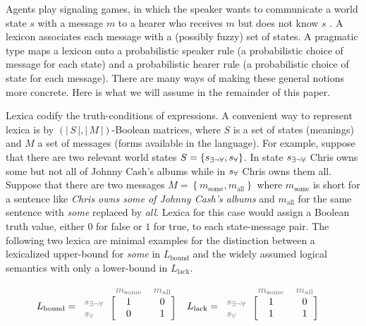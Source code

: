 \documentclass[a4paper, 11pt]{article}
\theoremstyle{Satz}
\newcommand{\set}[1]{\left\{#1\right\}}
\newcommand{\card}[1]{\left \lvert \, #1 \, \right\rvert}
\newcommand{\States}{\ensuremath{S}\xspace}		%
\newcommand{\state}{\ensuremath{s}\xspace}		%
\newcommand{\mystate}[1]{\ensuremath{\state_{\text{#1}}}\xspace} %
\newcommand{\mylang}[1]{\ensuremath{L_{\text{#1}}}\xspace} %
\newcommand{\Messgs}{\ensuremath{M}\xspace}		%
\newcommand{\messg}{\ensuremath{m}\xspace}		%
\newcommand{\mymessg}[1]{\ensuremath{\messg_{\text{#1}}}\xspace} %
\newcommand{\ssome}{\mystate{\ensuremath{\exists\neg\forall}}}
\newcommand{\sall}{\mystate{\ensuremath{\forall}}}
\newcommand{\msome}{\mymessg{some}}
\newcommand{\mall}{\mymessg{all}}
\newcommand{\Lbound}{\mylang{bound}}
\newcommand{\Llack}{\mylang{lack}}
\newcommand{\mygray}[1]{{\textcolor{mygray}{#1}}}
\begin{document}
Agents play signaling games, in which the speaker wants to communicate a world state $s$ with a
message $m$ to a hearer who receives $m$ but does not know $s$
\citep[e.g.][]{lewis:1969,Skyrms2010:Signals}. A lexicon associates each message with a
(possibly fuzzy) set of states. A pragmatic type maps a lexicon onto a probabilistic speaker
rule (a probabilistic choice of message for each state) and a probabilistic hearer rule (a
probabilistic choice of state for each message). There are many ways of making these general
notions more concrete. Here is what we will assume in the remainder of this paper.

Lexica codify the truth-conditions of expressions. A convenient way to represent lexica is by
$(\card{\States}, \card{\Messgs})$-Boolean matrices, where $\States$ is a set of states
(meanings) and $M$ a set of messages (forms available in the language). For example, suppose
that there are two relevant world states $\States = \set{\ssome, \sall}$. In state $\ssome$
Chris owns some but not all of Johnny Cash's albums while in $\sall$ Chris owns them
all. Suppose that there are two messages $\Messgs = \set{\msome, \mall}$ where $\msome$ is
short for a sentence like \emph{Chris owns some of Johnny Cash's albums} and $\mall$ for the
same sentence with \emph{some} replaced by \emph{all}.  Lexica for this case would assign a
Boolean truth value, either $0$ for false or $1$ for true, to each state-message pair. The
following two lexica are minimal examples for the distinction between a lexicalized upper-bound
for \emph{some} in $\Lbound$ and the widely assumed logical semantics with only a lower-bound
in $\Llack$.

\begin{align*}
  \Lbound & = \begin{blockarray}{lcc}
    & \mygray{\msome} & \mygray{\mall} \\
    \begin{block}{l[cc]}
      \mygray{\ssome} & 1 & 0 \\
      \mygray{\sall}  & 0 & 1 \\
    \end{block}
  \end{blockarray} &
  \Llack & = \begin{blockarray}{lcc}
    & \mygray{\msome} & \mygray{\mall} \\
    \begin{block}{l[cc]}
      \mygray{\ssome} & 1 & 0 \\
      \mygray{\sall}  & 1 & 1 \\
    \end{block}
  \end{blockarray}
\end{align*}
\end{document}

